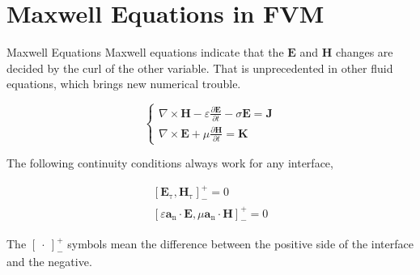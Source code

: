 
\section{Maxwell Equations in FVM}

\begin{frame}{Maxwell Equations}
Maxwell equations indicate that the $\boldsymbol{E}$ and $\boldsymbol{H}$ changes are decided by the curl of the other variable. \parencite{rao1999time} That is unprecedented in other fluid equations, which brings new numerical trouble.

\begin{equation}
\left\{\begin{array}{l}{\nabla \times \boldsymbol{H}-\varepsilon \frac{\partial \boldsymbol{E}}{\partial t}-\sigma \boldsymbol{E}=\boldsymbol{J}} \\ {\nabla \times \boldsymbol{E}+\mu \frac{\partial \boldsymbol{H}}{\partial t}=\boldsymbol{K}}\end{array}\right.
\end{equation}

The following continuity conditions always work for any interface,

\begin{equation}
\begin{array}{r}{\left[\boldsymbol{E}_{\mathrm{\tau}}, \boldsymbol{H}_{\mathrm{\tau}}\right]_{-}^{+}=0} \\ {\left[\varepsilon \boldsymbol{a}_{\mathrm{n}} \cdot \boldsymbol{E}, \mu \boldsymbol{a}_{\mathrm{n}} \cdot \boldsymbol{H}\right]_{-}^{+}=0}\end{array}
\end{equation}

The $[\ \cdot\ ]^+_-$ symbols mean the difference between the positive side of the interface and the negative.

\end{frame}



